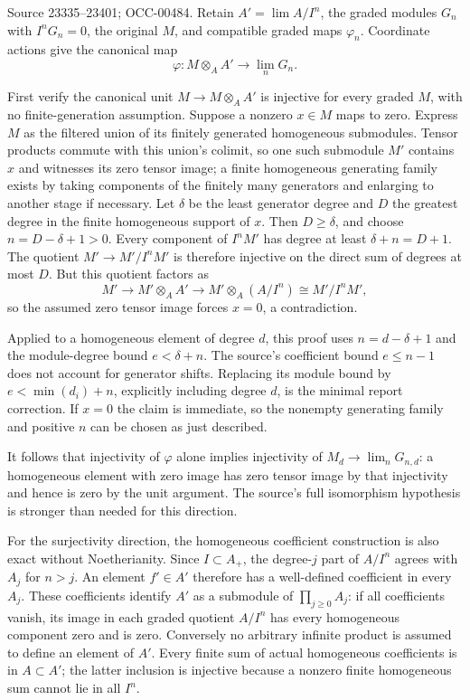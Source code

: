 Source 23335--23401; OCC-00484. Retain \(A'=\lim A/I^n\), the graded modules \(G_n\) with \(I^nG_n=0\), the original \(M\), and compatible graded maps \(\varphi_n\). Coordinate actions give the canonical map \[
\varphi:M\otimes_A A'\longrightarrow\lim_nG_n.
\]

First verify the canonical unit \(M\to M\otimes_AA'\) is injective for every graded \(M\), with no finite-generation assumption. Suppose a nonzero \(x\in M\) maps to zero. Express \(M\) as the filtered union of its finitely generated homogeneous submodules. Tensor products commute with this union's colimit, so one such submodule \(M'\) contains \(x\) and witnesses its zero tensor image; a finite homogeneous generating family exists by taking components of the finitely many generators and enlarging to another stage if necessary. Let \(\delta\) be the least generator degree and \(D\) the greatest degree in the finite homogeneous support of \(x\). Then \(D\geq\delta\), and choose \(n=D-\delta+1>0\). Every component of \(I^nM'\) has degree at least \(\delta+n=D+1\). The quotient \(M'\to M'/I^nM'\) is therefore injective on the direct sum of degrees at most \(D\). But this quotient factors as \[
M'\longrightarrow M'\otimes_AA'
 \longrightarrow M'\otimes_A(A/I^n)
 \cong M'/I^nM',
\] so the assumed zero tensor image forces \(x=0\), a contradiction.

Applied to a homogeneous element of degree \(d\), this proof uses \(n=d-\delta+1\) and the module-degree bound \(e<\delta+n\). The source's coefficient bound \(e\leq n-1\) does not account for generator shifts. Replacing its module bound by \(e<\min(d_i)+n\), explicitly including degree \(d\), is the minimal report correction. If \(x=0\) the claim is immediate, so the nonempty generating family and positive \(n\) can be chosen as just described.

It follows that injectivity of \(\varphi\) alone implies injectivity of \(M_d\to\lim_nG_{n,d}\): a homogeneous element with zero image has zero tensor image by that injectivity and hence is zero by the unit argument. The source's full isomorphism hypothesis is stronger than needed for this direction.

For the surjectivity direction, the homogeneous coefficient construction is also exact without Noetherianity. Since \(I\subset A_+\), the degree-\(j\) part of \(A/I^n\) agrees with \(A_j\) for \(n>j\). An element \(f'\in A'\) therefore has a well-defined coefficient in every \(A_j\). These coefficients identify \(A'\) as a submodule of \(\prod_{j\geq0}A_j\): if all coefficients vanish, its image in each graded quotient \(A/I^n\) has every homogeneous component zero and is zero. Conversely no arbitrary infinite product is assumed to define an element of \(A'\). Every finite sum of actual homogeneous coefficients is in \(A\subset A'\); the latter inclusion is injective because a nonzero finite homogeneous sum cannot lie in all \(I^n\).

